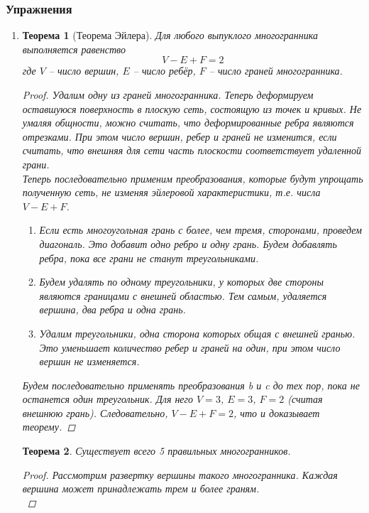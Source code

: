 \documentclass[12pt]{article}
\newtheorem{theorem}{Теорема}
\begin{document}
\subsubsection{Упражнения}
\begin{enumerate}
    \item \begin{theorem}[Теорема Эйлера]
    Для любого выпуклого многогранника выполняется равенство
    \begin{equation}
        V-E+F=2
    \end{equation}
    где $V$ -- число вершин, $E$ -- число ребёр, $F$ -- число граней многогранника.
    \begin{proof}
    Удалим одну из граней многогранника. Теперь деформируем оставшуюся поверхность в плоскую сеть, состоящую из точек и кривых. Не умаляя общности, можно считать, что деформированные ребра являются отрезками. При этом число вершин, ребер и граней не изменится, если считать, что внешняя для сети часть плоскости соответствует удаленной грани.\\
    Теперь последовательно применим преобразования, которые будут упрощать полученную сеть, не изменяя эйлеровой характеристики, т.е. числа $V-E+F$.
    \begin{enumerate}
        \item Если есть многоугольная грань с более, чем тремя, сторонами, проведем диагональ. Это добавит одно ребро и одну грань. Будем добавлять ребра, пока все грани не станут треугольниками.
        \item Будем удалять по одному треугольники, у которых две стороны являются границами с внешней областью. Тем самым, удаляется вершина, два ребра и одна грань.
        \item Удалим треугольники, одна сторона которых общая с внешней гранью. Это уменьшает количество ребер и граней на один, при этом число вершин не изменяется.
    \end{enumerate}
    Будем последовательно применять преобразования b и c до тех пор, пока не останется один треугольник. Для него $V=3$, $E=3$, $F=2$ (считая внешнюю грань). Следовательно, $V-E+F=2$, что и доказывает теорему.
    \end{proof}
    \end{theorem}
    \begin{theorem}
    Существует всего 5 правильных многогранников.
    \begin{proof}
Рассмотрим развертку вершины такого многогранника. Каждая вершина может принадлежать трем и более граням.\\

\end{proof}
\end{theorem}
\end{enumerate}
\end{document}
